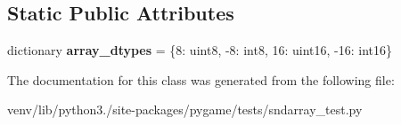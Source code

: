 \subsection*{Static Public Attributes}
\begin{DoxyCompactItemize}
\item 
\mbox{\label{classpygame_1_1tests_1_1sndarray__test_1_1_sndarray_test_a0845f3f93d265f12c167e01d5ae6131e}} 
dictionary {\bfseries array\+\_\+dtypes} = \{8\+: uint8, -\/8\+: int8, 16\+: uint16, -\/16\+: int16\}
\end{DoxyCompactItemize}


The documentation for this class was generated from the following file\+:\begin{DoxyCompactItemize}
\item 
venv/lib/python3./site-\/packages/pygame/tests/sndarray\+\_\+test.\+py\end{DoxyCompactItemize}
